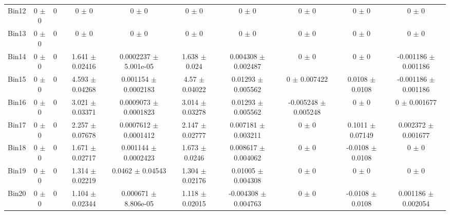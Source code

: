 \begin{tabular}{@{\extracolsep{4pt}}lccccccccc@{}}
     Bin12 & 0 $\pm$ 0 & 0 & 0 $\pm$ 0 & 0 $\pm$ 0 & 0 $\pm$ 0 & 0 $\pm$ 0 & 0 $\pm$ 0 & 0 $\pm$ 0 & 0 $\pm$ 0 \\ 
     Bin13 & 0 $\pm$ 0 & 0 & 0 $\pm$ 0 & 0 $\pm$ 0 & 0 $\pm$ 0 & 0 $\pm$ 0 & 0 $\pm$ 0 & 0 $\pm$ 0 & 0 $\pm$ 0 \\ 
     Bin14 & 0 $\pm$ 0 & 0 & 1.641 $\pm$ 0.02416 & 0.0002237 $\pm$ 5.001e-05 & 1.638 $\pm$ 0.024 & 0.004308 $\pm$ 0.002487 & 0 $\pm$ 0 & 0 $\pm$ 0 & -0.001186 $\pm$ 0.001186 \\ 
     Bin15 & 0 $\pm$ 0 & 0 & 4.593 $\pm$ 0.04268 & 0.001154 $\pm$ 0.0002183 & 4.57 $\pm$ 0.04022 & 0.01293 $\pm$ 0.005562 & 0 $\pm$ 0.007422 & 0.0108 $\pm$ 0.0108 & -0.001186 $\pm$ 0.001186 \\ 
     Bin16 & 0 $\pm$ 0 & 0 & 3.021 $\pm$ 0.03371 & 0.0009073 $\pm$ 0.0001823 & 3.014 $\pm$ 0.03278 & 0.01293 $\pm$ 0.005562 & -0.005248 $\pm$ 0.005248 & 0 $\pm$ 0 & 0 $\pm$ 0.001677 \\ 
     Bin17 & 0 $\pm$ 0 & 0 & 2.257 $\pm$ 0.07678 & 0.0007612 $\pm$ 0.0001412 & 2.147 $\pm$ 0.02777 & 0.007181 $\pm$ 0.003211 & 0 $\pm$ 0 & 0.1011 $\pm$ 0.07149 & 0.002372 $\pm$ 0.001677 \\ 
     Bin18 & 0 $\pm$ 0 & 0 & 1.671 $\pm$ 0.02717 & 0.001144 $\pm$ 0.0002423 & 1.673 $\pm$ 0.0246 & 0.008617 $\pm$ 0.004062 & 0 $\pm$ 0 & -0.0108 $\pm$ 0.0108 & 0 $\pm$ 0 \\ 
     Bin19 & 0 $\pm$ 0 & 0 & 1.314 $\pm$ 0.02219 & 0.0462 $\pm$ 0.04543 & 1.304 $\pm$ 0.02176 & 0.01005 $\pm$ 0.004308 & 0 $\pm$ 0 & 0 $\pm$ 0 & 0 $\pm$ 0 \\ 
     Bin20 & 0 $\pm$ 0 & 0 & 1.104 $\pm$ 0.02344 & 0.000671 $\pm$ 8.806e-05 & 1.118 $\pm$ 0.02015 & -0.004308 $\pm$ 0.004763 & 0 $\pm$ 0 & -0.0108 $\pm$ 0.0108 & 0.001186 $\pm$ 0.002054 \\ 
\hline\hline
  \end{tabular}
